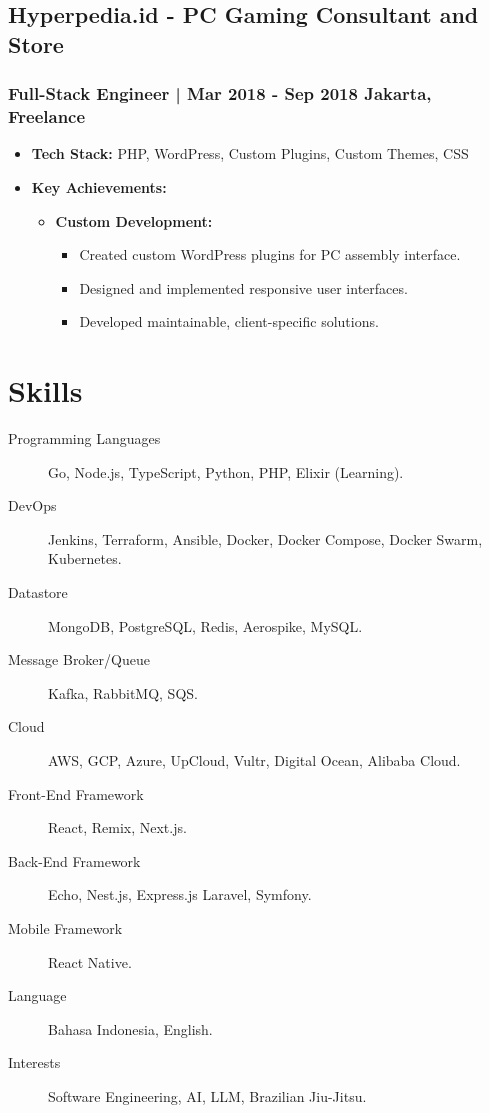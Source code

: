 \documentclass[11pt]{article}
\begin{document}
\subsection{Hyperpedia.id - PC Gaming Consultant and Store}
\subsubsection{Full-Stack Engineer | Mar 2018 - Sep 2018 \hfill Jakarta, Freelance}
\begin{itemize}
    \item \textbf{Tech Stack:} PHP, WordPress, Custom Plugins, Custom Themes, CSS
    \item \textbf{Key Achievements:}
    \begin{itemize}
        \item \textbf{Custom Development:}
        \begin{itemize}
            \item Created custom WordPress plugins for PC assembly interface.
            \item Designed and implemented responsive user interfaces.
            \item Developed maintainable, client-specific solutions.
        \end{itemize}
    \end{itemize}
\end{itemize}

\section{Skills}
\begin{description}
    \item[Programming Languages] Go, Node.js, TypeScript, Python, PHP, Elixir (Learning).
    \item[DevOps] Jenkins, Terraform, Ansible, Docker, Docker Compose, Docker Swarm, Kubernetes.
    \item[Datastore] MongoDB, PostgreSQL, Redis, Aerospike, MySQL.
    \item[Message Broker/Queue] Kafka, RabbitMQ, SQS.
    \item[Cloud] AWS, GCP, Azure, UpCloud, Vultr, Digital Ocean, Alibaba Cloud.
    \item[Front-End Framework] React, Remix, Next.js.
    \item[Back-End Framework] Echo, Nest.js, Express.js Laravel, Symfony.
    \item[Mobile Framework] React Native.
    \item[Language] Bahasa Indonesia, English.
    \item[Interests] Software Engineering, AI, LLM, Brazilian Jiu-Jitsu.
\end{description}
\end{document}
